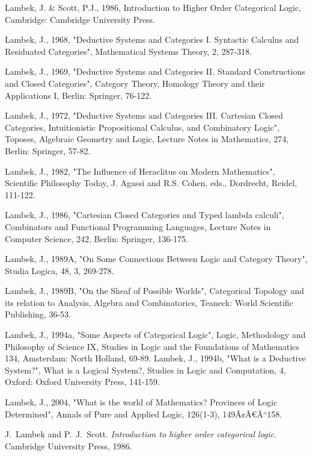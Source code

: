 \documentclass[12pt]{article}
\begin{document}
\begin{thebibliography}{199}
Lambek, J. \& Scott, P.J., 1986, Introduction to Higher Order Categorical Logic, Cambridge: Cambridge University Press. 

Lambek, J., 1968, "Deductive Systems and Categories I. Syntactic Calculus and Residuated Categories", Mathematical Systems Theory, 2, 287-318. 

Lambek, J., 1969, "Deductive Systems and Categories II. Standard Constructions and Closed Categories", Category Theory, Homology Theory and their Applications I, Berlin: Springer, 76-122. 

Lambek, J., 1972, "Deductive Systems and Categories III. Cartesian Closed Categories, Intuitionistic Propositional Calculus, and Combinatory Logic", Toposes, Algebraic Geometry and Logic, Lecture Notes in Mathematics, 274, Berlin: Springer, 57-82.  

Lambek, J., 1982, "The Influence of Heraclitus on Modern Mathematics", Scientific Philosophy Today, J. Agassi and R.S. Cohen, eds., Dordrecht, Reidel, 111-122.  

Lambek, J., 1986, "Cartesian Closed Categories and Typed lambda calculi", Combinators and Functional Programming Languages, Lecture Notes in Computer Science, 242, Berlin: Springer, 136-175.   

Lambek, J., 1989A, "On Some Connections Between Logic and Category Theory", Studia Logica, 48, 3, 269-278. 

Lambek, J., 1989B, "On the Sheaf of Possible Worlds", Categorical Topology and its relation to Analysis, Algebra and Combinatorics, Teaneck: World Scientific Publishing, 36-53. 

Lambek, J., 1994a, "Some Aspects of Categorical Logic", Logic, Methodology and Philosophy of Science IX, Studies in Logic and the Foundations of Mathematics 134, Amsterdam: North Holland, 69-89. 
Lambek, J., 1994b, "What is a Deductive System?", What is a Logical System?, Studies in Logic and Computation, 4, Oxford: Oxford University Press, 141-159.  
 
Lambek, J., 2004, "What is the world of Mathematics? Provinces of Logic Determined", Annals of Pure and Applied Logic, 126(1-3), 149Ã¢Â€Â“158. 

J.~Lambek and P.~J.~Scott. {\em Introduction to higher order categorical logic}. Cambridge University Press, 1986.


\end{thebibliography}
\end{document}
